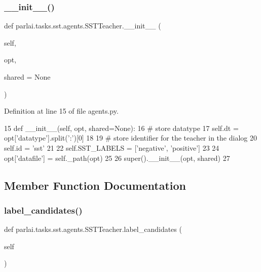 \subsubsection{\texorpdfstring{\+\_\+\+\_\+init\+\_\+\+\_\+()}{\_\_init\_\_()}}
{\footnotesize\ttfamily def parlai.\+tasks.\+sst.\+agents.\+S\+S\+T\+Teacher.\+\_\+\+\_\+init\+\_\+\+\_\+ (\begin{DoxyParamCaption}\item[{}]{self,  }\item[{}]{opt,  }\item[{}]{shared = {\ttfamily None} }\end{DoxyParamCaption})}



Definition at line 15 of file agents.\+py.


\begin{DoxyCode}
15     \textcolor{keyword}{def }\_\_init\_\_(self, opt, shared=None):
16         \textcolor{comment}{# store datatype}
17         self.dt = opt[\textcolor{stringliteral}{'datatype'}].split(\textcolor{stringliteral}{':'})[0]
18 
19         \textcolor{comment}{# store identifier for the teacher in the dialog}
20         self.id = \textcolor{stringliteral}{'sst'}
21 
22         self.SST\_LABELS = [\textcolor{stringliteral}{'negative'}, \textcolor{stringliteral}{'positive'}]
23 
24         opt[\textcolor{stringliteral}{'datafile'}] = self.\_path(opt)
25 
26         super().\_\_init\_\_(opt, shared)
27 
\end{DoxyCode}


\subsection{Member Function Documentation}
\mbox{\label{classparlai_1_1tasks_1_1sst_1_1agents_1_1SSTTeacher_a5aaa8e39d75024b956a2c2f66f554156}} 
\subsubsection{\texorpdfstring{label\+\_\+candidates()}{label\_candidates()}}
{\footnotesize\ttfamily def parlai.\+tasks.\+sst.\+agents.\+S\+S\+T\+Teacher.\+label\+\_\+candidates (\begin{DoxyParamCaption}\item[{}]{self }\end{DoxyParamCaption})}



